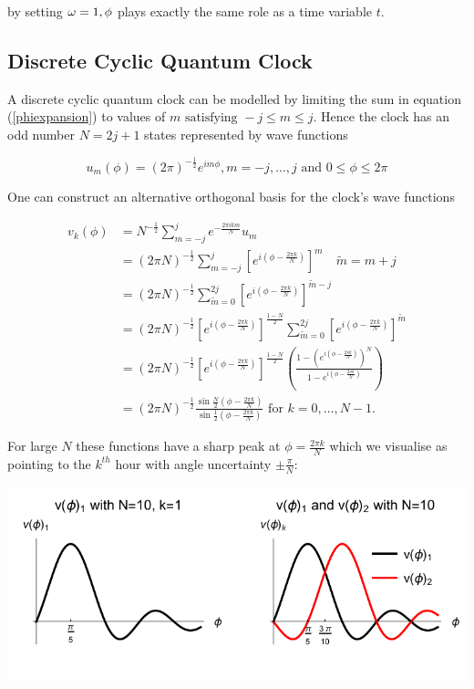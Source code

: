 \documentclass{article}
\begin{document}
\noindent by setting $\omega = 1, \space \phi$ plays exactly the same role as a time variable $t$.

\subsection{Discrete Cyclic Quantum Clock}
A discrete cyclic quantum clock can be modelled by limiting the sum in equation (\ref{phiexpansion}) to values of \linebreak $m \text{ satisfying } -j \leq m \leq j$. Hence the clock has an odd number $N = 2j+1$ states represented by wave functions

\begin{equation}
	u_m(\phi) = (2\pi)^{-\frac{1}{2}}e^{im\phi}, m = -j,\dots, j \text{ and } 0 \leq \phi \leq 2\pi
\end{equation}

\noindent One can construct an alternative orthogonal basis for the clock's wave functions

\begin{align}
	v_k(\phi) &= N^{-\frac{1}{2}}\sum_{m=-j}^j e^{-\frac{2\pi ikm}{N}}u_m \\
		    &= (2\pi N)^{-\frac{1}{2}}\sum_{m=-j}^j [e^{i(\phi-\frac{2\pi k}{N})}]^m \quad \tilde{m} = m+j \\
		    &= (2\pi N)^{-\frac{1}{2}}\sum_{\tilde{m}=0}^{2j} [e^{i(\phi-\frac{2\pi k}{N})}]^{\tilde{m}-j} \\
		    &= (2\pi N)^{-\frac{1}{2}}[e^{i(\phi-\frac{2\pi k}{N})}]^{\frac{1-N}{2}}\sum_{\tilde{m}=0}^{2j}[e^{i(\phi-\frac{2\pi k}{N})}]^{\tilde{m}} \\
		    &= (2\pi N)^{-\frac{1}{2}}[e^{i(\phi-\frac{2\pi k}{N})}]^{\frac{1-N}{2}}\left(\frac{1-(e^{i(\phi-\frac{2\pi k}{N})})^N}{1-e^{i(\phi-\frac{2\pi k}{N})}}\right) \\
		    &= (2\pi N)^{-\frac{1}{2}}\frac{\sin{\frac{N}{2}(\phi-\frac{2\pi k}{N})}}{\sin{\frac{1}{2}(\phi-\frac{2\pi k}{N})}} \text{ for } k = 0,\dots,N-1.
\end{align}

\noindent For large $N$ these functions have a sharp peak at $\phi = \frac{2\pi k}{N}$ which we visualise as pointing to the $k^{th}$ hour with angle uncertainty $\pm \frac{\pi}{N}$:

\begin{center}
\includegraphics{plot1.pdf}
\end{center}
\end{document}
